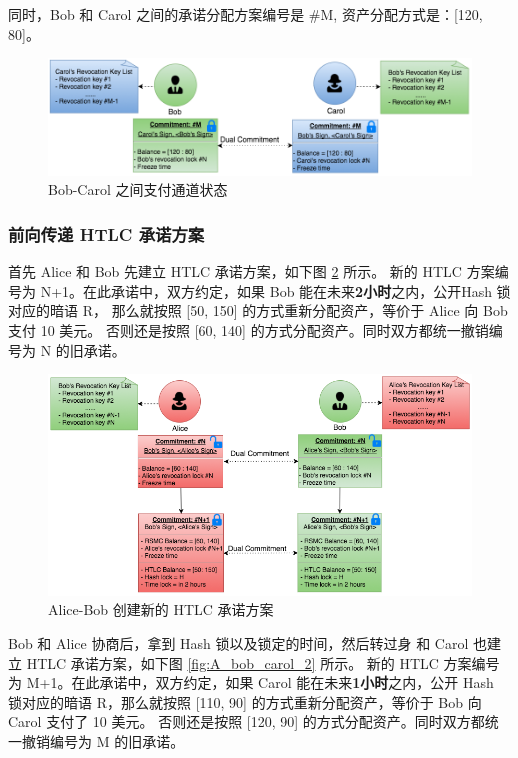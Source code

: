 \begin{appendices}
同时，Bob 和 Carol 之间的承诺分配方案编号是 \#M, 资产分配方式是：[120, 80]。

\begin{figure}[h!]
    \centering
    \includegraphics[width=12cm, keepaspectratio]{../images/bob_carol_1.png}
    \caption{Bob-Carol 之间支付通道状态}
    \label{fig:A_bob_carol_1}
\end{figure}

\subsubsection{前向传递 HTLC 承诺方案}
首先 Alice 和 Bob 先建立 HTLC 承诺方案，如下图 \ref{fig:A_alice_bob_2} 所示。
新的 HTLC 方案编号为 N+1。在此承诺中，双方约定，如果 Bob 能在未来\textbf{2小时}之内，公开Hash 锁对应的暗语 R，
那么就按照 [50, 150] 的方式重新分配资产，等价于 Alice 向 Bob 支付 10 美元。
否则还是按照 [60, 140] 的方式分配资产。同时双方都统一撤销编号为 N 的旧承诺。

\begin{figure}[h!]
    \centering
    \includegraphics[width=12cm, keepaspectratio]{../images/alice_bob_2.png}
    \caption{Alice-Bob 创建新的 HTLC 承诺方案}
    \label{fig:A_alice_bob_2}
\end{figure}

Bob 和 Alice 协商后，拿到 Hash 锁以及锁定的时间，然后转过身 和 Carol 也建立 HTLC 承诺方案，如下图 \ref{fig:A_bob_carol_2} 所示。
新的 HTLC 方案编号为 M+1。在此承诺中，双方约定，如果 Carol 能在未来\textbf{1小时}之内，公开 Hash 锁对应的暗语 R，那么就按照 [110, 90] 的方式重新分配资产，等价于 Bob 向 Carol 支付了 10 美元。
否则还是按照 [120, 90] 的方式分配资产。同时双方都统一撤销编号为 M 的旧承诺。


\end{appendices}
